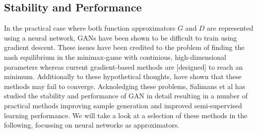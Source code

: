 

\newpage

\subsection{Stability and Performance}
\label{sub:gan_stability}
In the practical case where both function approximators $G$ and $D$ are represented using a neural network,
GANs have been shown to be difficult to train using gradient descent.
These issues have been credited to the problem of finding the nash equilibrium in the minimax-game with continious, high-dimensional parameters whereas current gradient-based methods are [designed] to reach an minimum.
Additionally to these hypothetical thoughts, \cite{gan_distinguish_crit:2014} have shown that these methods may fail to converge.
Acknoledging these problems, Salimans et al \cite{improved_gan:2016} has studied the stability and performance of GAN in detail resulting in a number of practical methods improving sample generation and improved semi-supervised learning performance.
We will take a look at a selection of these methods in the following, focussing on neural networks as approximators.

